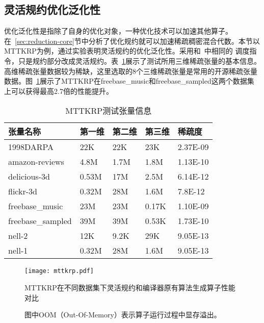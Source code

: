 \subsection{灵活规约优化泛化性}
优化泛化性是指除了自身的优化对象，一种优化技术可以加速其他算子。在~\ref{sec:reduction-core}节中分析了优化规约就可以加速稀疏稠密混合代数。本节以MTTKRP为例，通过实验表明灵活规约的优化泛化性。采用和~\cite{senanayake:2020:scheduling}中相同的
调度指令，只是规约部分改成灵活规约。表~\ref{tab:tensor-info}展示了测试所用三维稀疏张量的基本信息。高维稀疏张量数据较为稀缺，这里选取的8个三维稀疏张量是常用的开源稀疏张量数据。图~\ref{fig:comp-mttkrp}展示了MTTKRP在freebase\_music和freebase\_sampled这两个数据集上可以获得最高2.7倍的性能提升。
\begin{table}
  \centering
  \caption{MTTKRP测试张量信息}
  \begin{tabular}{lllll}
  \toprule
  张量名称& 第一维  & 第二维 & 第三维 & 稀疏度 \\
  \midrule
  1998DARPA   & 22K  & 22K & 23K  & 2.37E-09\\
  amazon-reviews   & 4.8M  & 1.7M & 1.8M  & 1.13E-10\\
  delicious-3d   & 0.53M  & 17M & 2.5M  & 6.14E-12\\
  flickr-3d   & 0.32M  & 28M & 1.6M  & 7.8E-12\\
  freebase\_music   & 23M  & 23M & 0.17K  & 1.10E-09\\
  freebase\_sampled   & 39M  & 39M & 0.53K  & 1.73E-10\\
  nell-2   & 12K  & 9.2K & 29K  & 9.05E-13\\
  nell-1   & 0.32M  & 28M & 1.6M  & 9.05E-13\\
  \bottomrule
  \end{tabular}
  \label{tab:tensor-info}
\end{table}
\begin{figure}[h]%
  \centering
  \texttt{[image: mttkrp.pdf]}
  \caption{MTTKRP在不同数据集下灵活规约和编译器原有算法生成算子性能对比}
  \caption*{图中OOM（Out-Of-Memory）表示算子运行过程中显存溢出。}
  \label{fig:comp-mttkrp}
\end{figure}